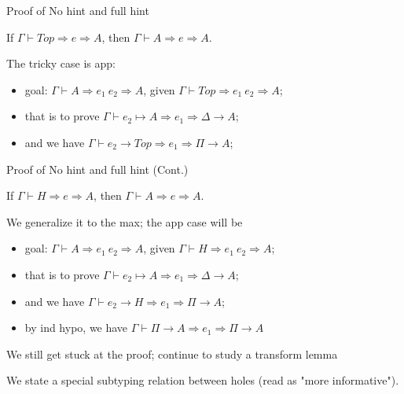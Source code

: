\begin{frame}{Proof of No hint and full hint}
\begin{lemma}
If $\Gamma \vdash Top \Rightarrow e \Rightarrow A$, then $\Gamma \vdash A \Rightarrow e \Rightarrow A$.
\end{lemma}
The tricky case is app:
\begin{itemize}
	\item goal: $\Gamma \vdash A \Rightarrow e_1~e_2 \Rightarrow A$, given $\Gamma \vdash Top \Rightarrow e_1~e_2 \Rightarrow A$;
	\item that is to prove $\Gamma \vdash \boxed{e_2} \mapsto A \Rightarrow e_1 \Rightarrow \Delta \rightarrow A$;
	\item and we have $\Gamma \vdash \boxed{e_2} \rightarrow Top \Rightarrow e_1 \Rightarrow \Pi \rightarrow A$;
\end{itemize}
\end{frame}

\begin{frame}{Proof of No hint and full hint (Cont.)}
\begin{lemma}
If $\Gamma \vdash H \Rightarrow e \Rightarrow A$, then $\Gamma \vdash A \Rightarrow e \Rightarrow A$.
\end{lemma}

We generalize it to the max; the app case will be
\begin{itemize}
	\item goal: $\Gamma \vdash A \Rightarrow e_1~e_2 \Rightarrow A$, given $\Gamma \vdash H \Rightarrow e_1~e_2 \Rightarrow A$;
	\item that is to prove $\Gamma \vdash \boxed{e_2} \mapsto A \Rightarrow e_1 \Rightarrow \Delta \rightarrow A$;
	\item and we have $\Gamma \vdash \boxed{e_2} \rightarrow H \Rightarrow e_1 \Rightarrow \Pi \rightarrow A$;
	\item by ind hypo, we have $\Gamma \vdash \Pi \rightarrow A \Rightarrow e_1 \Rightarrow \Pi \rightarrow A$
\end{itemize}

We still get stuck at the proof; continue to study a transform lemma
\end{frame}

\begin{frame}[Properties]
We state a special subtyping relation between holes (read as "more informative").


\end{frame}